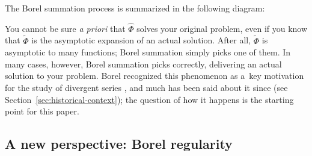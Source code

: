 \documentclass[pdftex]{sigma}
\newcommand{\series}[1]{\tilde{#1}}
\newcommand{\laplace}{\mathcal{L}}
\newcommand{\borel}{\mathcal{B}}
\newcommand{\aexp}{\text{\rm \ae}}
\numberwithin{equation}{section}
\begin{document}
The Borel summation process is summarized in the following diagram:
\begin{center}
\end{center}

You cannot be sure {\em a priori} that $\hat{\Phi}$ solves your original problem, even if you know that $\series{\Phi}$ is the asymptotic expansion of an actual solution. After all, $\series{\Phi}$ is asymptotic to many functions; Borel summation simply picks one of them. In many cases, however, Borel summation picks correctly, delivering an actual solution to your problem. Borel recognized this phenomenon as a~key motivation for the study of divergent series \cite{borel-memoire,borel-lecons}, and much has been said about it since (see Section~\ref{sec:historical-context}); the question of how it happens is the starting point for this paper.

\subsection{A new perspective: Borel regularity}
\end{document}
